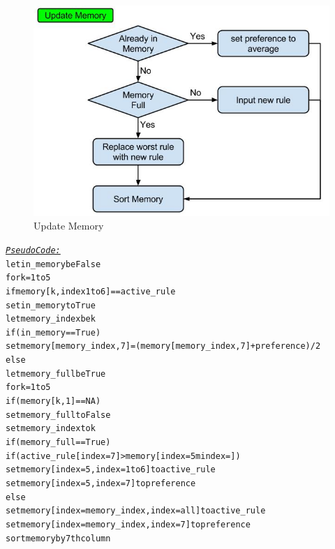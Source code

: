 \documentclass[a4paper]{article}
\begin{document}
\begin{figure}[!ht]
\includegraphics[width =\textwidth]{update_memory.jpg}
\caption{Update Memory}
\label{update_memory}
\end{figure}
\begin{alltt}
 \underline{\textit{Pseudo Code:}}
 let in_memory be False
for k = 1 to 5
    if memory[k ,index 1 to 6] == active_rule
        set in_memory to True
        let memory_index  be k
if (in_memory == True)
    set memory[memory_index,7] = (memory[memory_index,7] +preference)  / 2
else 
    let memory_full be True
    for k = 1 to 5 
        if (memory[k ,1] ==NA) 
            set memory_full to False
            set memory_index to k 
    if (memory_full == True)
        if (active_rule[index = 7] > memory[index = 5m index = ])
            set memory[index = 5, index = 1 to 6] to active_rule
            set memory[index = 5, index = 7] to preference
    else 
        set memory[index = memory_index,index = all] to active_rule
        set memory[index = memory_index, index = 7] to preference
sort memory by 7th column
\end{alltt}
\end{document}
